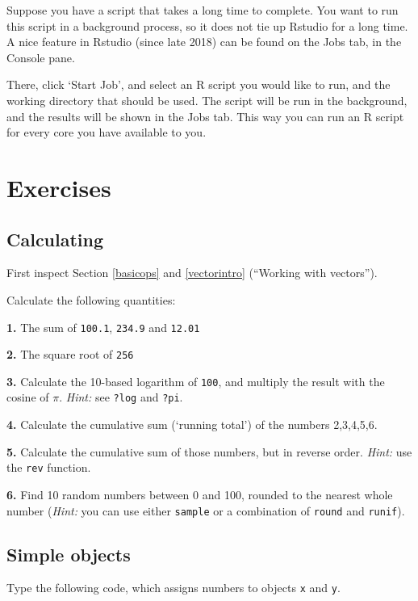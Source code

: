 \documentclass[]{book}
\begin{document}
Suppose you have a script that takes a long time to complete. You want to run this script in a background process, so it does not tie up Rstudio for a long time. A nice feature in Rstudio (since late 2018) can be found on the Jobs tab, in the Console pane.

There, click `Start Job', and select an R script you would like to run, and the working directory that should be used. The script will be run in the background, and the results will be shown in the Jobs tab. This way you can run an R script for every core you have available to you.

\hypertarget{exercises}{%
\section{Exercises}\label{exercises}}

\hypertarget{calculating}{%
\subsection{Calculating}\label{calculating}}

First inspect Section \ref{basicops} and \ref{vectorintro} (``Working with vectors'').

Calculate the following quantities:

\textbf{1.} The sum of \texttt{100.1}, \texttt{234.9} and \texttt{12.01}

\textbf{2.} The square root of \texttt{256}

\textbf{3.} Calculate the 10-based logarithm of \texttt{100}, and multiply the result with the cosine of \(\pi\). \emph{Hint:} see \texttt{?log} and \texttt{?pi}.

\textbf{4.} Calculate the cumulative sum (`running total') of the numbers 2,3,4,5,6.

\textbf{5.} Calculate the cumulative sum of those numbers, but in reverse order. \emph{Hint:} use the \texttt{rev} function.

\textbf{6.} Find 10 random numbers between 0 and 100, rounded to the nearest whole number (\emph{Hint:} you can use either \texttt{sample} or a combination of \texttt{round} and \texttt{runif}).

\hypertarget{simple-objects}{%
\subsection{Simple objects}\label{simple-objects}}

Type the following code, which assigns numbers to objects \texttt{x} and \texttt{y}.
\end{document}
